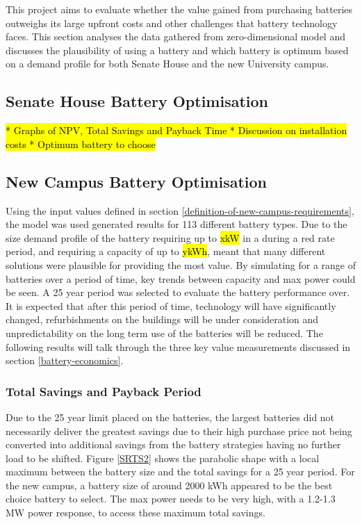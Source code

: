 This project aims to evaluate whether the value gained from purchasing
batteries outweighs its large upfront costs and other challenges that
battery technology faces. This section analyses the data gathered from
zero-dimensional model and discusses the plausibility of using a battery
and which battery is optimum based on a demand profile for both Senate
House and the new University campus.

\subsection{Senate House Battery
Optimisation}\label{senate-house-battery-optimisation}

\hl{
  * Graphs of NPV, Total Savings and Payback Time
  * Discussion on installation costs
  * Optimum battery to choose
}

\subsection{New Campus Battery
Optimisation}\label{new-campus-battery-optimisation}

Using the input values defined in section
\ref{definition-of-new-campus-requirements}, the model was used
generated results for 113 different battery types. Due to the size
demand profile of the battery requiring up to \hl{xkW} in a during a red
rate period, and requiring a capacity of up to \hl{ykWh}, meant that
many different solutions were plausible for providing the most value. By
simulating for a range of batteries over a period of time, key trends
between capacity and max power could be seen. A 25 year period was
selected to evaluate the battery performance over. It is expected that
after this period of time, technology will have significantly changed,
refurbishments on the buildings will be under consideration and
unpredictability on the long term use of the batteries will be reduced.
The following results will talk through the three key value measurements
discussed in section \ref{battery-economics}.

\subsubsection{Total Savings and Payback
Period}\label{total-savings-and-payback-period}

Due to the 25 year limit placed on the batteries, the largest batteries
did not necessarily deliver the greatest savings due to their high
purchase price not being converted into additional savings from the
battery strategies having no further load to be shifted. Figure
\ref{SRTS2} shows the parabolic shape with a local maximum between the
battery size and the total savings for a 25 year period. For the new
campus, a battery size of around 2000 kWh appeared to be the best choice
battery to select. The max power needs to be very high, with a 1.2-1.3
MW power response, to access these maximum total savings.

